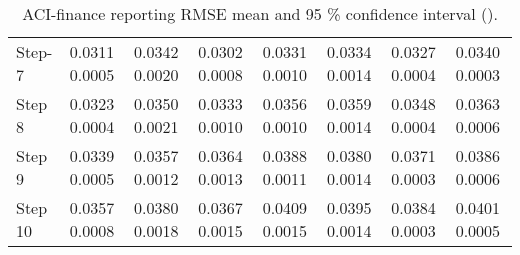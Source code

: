 \documentclass[final,5p,times,twocolumn]{elsarticle}
\begin{document}
\begin{table*}[htbp]
\begin{tabular}{llllllll}
Step-7 & 0.0311   0.0005 & 0.0342    0.0020  & 0.0302    0.0008  &  0.0331   0.0010 &  0.0334   0.0014  &  0.0327   0.0004 & 0.0340	0.0003 \\

Step 8 &  0.0323   0.0004 & 0.0350   0.0021  & 0.0333   0.0010  &  0.0356  0.0010 &  0.0359   0.0014  &  0.0348  0.0004  & 0.0363	0.0006 \\

Step 9 &  0.0339   0.0005 & 0.0357    0.0012  & 0.0364    0.0013  &  0.0388  0.0011 &  0.0380   0.0014  &  0.0371   0.0003 & 0.0386	0.0006 \\

Step 10 &  0.0357   0.0008 & 0.0380    0.0018  & 0.0367   0.0015  &  0.0409   0.0015 &  0.0395   0.0014  &  0.0384   0.0003 & 0.0401	0.0005 \\
\hline
\end{tabular}
\caption{ACI-finance reporting RMSE mean and 95 \% confidence interval   ().}
\label{tab:finance}
\end{table*}
\end{document}

